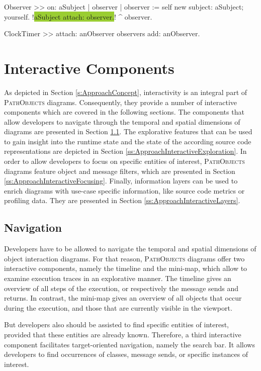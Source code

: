 \begin{smalltalk}[caption={Foo}, label=lst:ApproachExample, escapechar=!]
Observer >> on: aSubject
	| observer |
	observer := self new
		subject: aSubject;
		yourself.
	!\colorbox{YellowGreen}{aSubject attach: observer.}!
	^ observer.

ClockTimer >> attach: anObserver
	observers add: anObserver.
\end{smalltalk}

\section{Interactive Components}
\label{s:ApproachInteractivity}
As depicted in Section \ref{s:ApproachConcept}, interactivity is an integral part of \textsc{PathObjects} diagrams.
Consequently, they provide a number of interactive components which are covered in the following sections.
The components that allow developers to navigate through the temporal and spatial dimensions of diagrams are presented in Section \ref{ss:ApproachInteractiveNavigation}.
The explorative features that can be used to gain insight into the runtime state and the state of the according source code representations are depicted in Section \ref{ss:ApproachInteractiveExploration}.
In order to allow developers to focus on specific entities of interest, \textsc{PathObjects} diagrams feature object and message filters, which are presented in Section \ref{ss:ApproachInteractiveFocusing}.
Finally, information layers can be used to enrich diagrams with use-case specific information, like source code metrics or profiling data.
They are presented in Section \ref{ss:ApproachInteractiveLayers}.

\subsection{Navigation}
\label{ss:ApproachInteractiveNavigation}
Developers have to be allowed to navigate the temporal and spatial dimensions of object interaction diagrams.
For that reason, \textsc{PathObjects} diagrams offer two interactive components, namely the timeline and the mini-map, which allow to examine execution traces in an explorative manner.
The timeline gives an overview of all steps of the execution, or respectively the message sends and returns.
In contrast, the mini-map gives an overview of all objects that occur during the execution, and those that are currently visible in the viewport.

But developers also should be assisted to find specific entities of interest, provided that these entities are already known.
Therefore, a third interactive component facilitates target-oriented navigation, namely the search bar.
It allows developers to find occurrences of classes, message sends, or specific instances of interest.

